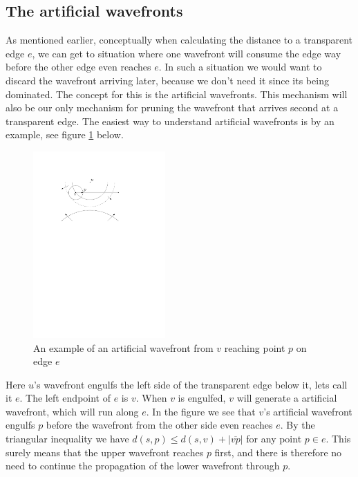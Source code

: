 \subsection{The artificial wavefronts}

As mentioned earlier, conceptually when calculating the distance to a transparent edge $e$, we 
can get to situation where one wavefront will consume the edge way before the other edge even 
reaches $e$. In such a situation we would want to discard the wavefront arriving later, 
because we don't need it since its being dominated. The concept for this is the artificial wavefronts. 
This mechanism will also be our only mechanism for pruning the wavefront that arrives second at a 
transparent edge. The easiest way to understand artificial wavefronts is by an example, see figure 
\ref{fig:artificialwavefront} below.

\begin{figure}[H]
	\centering
	\includegraphics[width=0.45\textwidth]{figures/artificialwavefront.pdf}
	\caption{An example of an artificial wavefront from $v$ reaching point $p$ on edge $e$\cite{HershbergerS99}}
	\label{fig:artificialwavefront}
\end{figure}

Here $u$'s wavefront engulfs the left side of the transparent edge below it, lets call it $e$. 
The left endpoint of $e$ is $v$. When $v$ is engulfed, $v$ will generate a artificial wavefront, 
which will run along $e$. In the figure we see that $v$'s artificial wavefront engulfs $p$ 
before the wavefront from the other side even reaches $e$. By the triangular inequality we 
have $d(s,p) \leq d(s,v) + |\overline{vp}|$ for any point $p \in e$. This surely means that 
the upper wavefront reaches $p$ first, and there is therefore no need to continue the 
propagation of the lower wavefront through $p$.

